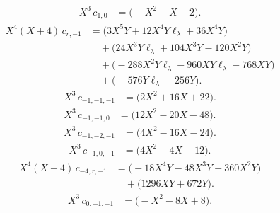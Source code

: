 \begin{equation}
\begin{aligned}
X^{3}\,c_{1,0}&={}\bigl(- X^{2} + X - 2\bigr).
\end{aligned}
\end{equation}
\begin{equation}
\begin{aligned}
X^{4} \left(X + 4\right)\,c_{r,-1}&={}\bigl(3 X^{5} Y + 12 X^{4} Y \ell_\lambda + 36 X^{4} Y\bigr)\\
&\quad{}+\bigl(24 X^{3} Y \ell_\lambda + 104 X^{3} Y - 120 X^{2} Y\bigr)\\
&\quad{}+\bigl(- 288 X^{2} Y \ell_\lambda - 960 X Y \ell_\lambda - 768 X Y\bigr)\\
&\quad{}+\bigl(- 576 Y \ell_\lambda - 256 Y\bigr).
\end{aligned}
\end{equation}
\begin{equation}
\begin{aligned}
X^{3}\,c_{-1,-1,-1}&={}\bigl(2 X^{2} + 16 X + 22\bigr).
\end{aligned}
\end{equation}
\begin{equation}
\begin{aligned}
X^{3}\,c_{-1,-1,0}&={}\bigl(12 X^{2} - 20 X - 48\bigr).
\end{aligned}
\end{equation}
\begin{equation}
\begin{aligned}
X^{3}\,c_{-1,-2,-1}&={}\bigl(4 X^{2} - 16 X - 24\bigr).
\end{aligned}
\end{equation}
\begin{equation}
\begin{aligned}
X^{3}\,c_{-1,0,-1}&={}\bigl(4 X^{2} - 4 X - 12\bigr).
\end{aligned}
\end{equation}
\begin{equation}
\begin{aligned}
X^{4} \left(X + 4\right)\,c_{-4,r,-1}&={}\bigl(- 18 X^{4} Y - 48 X^{3} Y + 360 X^{2} Y\bigr)\\
&\quad{}+\bigl(1296 X Y + 672 Y\bigr).
\end{aligned}
\end{equation}
\begin{equation}
\begin{aligned}
X^{3}\,c_{0,-1,-1}&={}\bigl(- X^{2} - 8 X + 8\bigr).
\end{aligned}
\end{equation}
